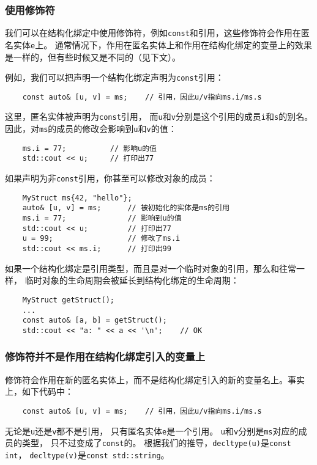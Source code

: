 \subsubsection*{使用修饰符}
我们可以在结构化绑定中使用修饰符，例如\texttt{const}和引用，这些修饰符会作用在匿名实体\texttt{e}上。
通常情况下，作用在匿名实体上和作用在结构化绑定的变量上的效果是一样的，但有些时候又是不同的（见下文）。

例如，我们可以把声明一个结构化绑定声明为\texttt{const}引用：
\begin{lstlisting}
    const auto& [u, v] = ms;    // 引用，因此u/v指向ms.i/ms.s
\end{lstlisting}
这里，匿名实体被声明为\texttt{const}引用，
而\texttt{u}和\texttt{v}分别是这个引用的成员\texttt{i}和\texttt{s}的别名。
因此，对\texttt{ms}的成员的修改会影响到\texttt{u}和\texttt{v}的值：
\begin{lstlisting}
    ms.i = 77;          // 影响u的值
    std::cout << u;     // 打印出77
\end{lstlisting}
如果声明为非\texttt{const}引用，你甚至可以修改对象的成员：
\begin{lstlisting}
    MyStruct ms{42, "hello"};
    auto& [u, v] = ms;      // 被初始化的实体是ms的引用
    ms.i = 77;              // 影响到u的值
    std::cout << u;         // 打印出77
    u = 99;                 // 修改了ms.i
    std::cout << ms.i;      // 打印出99
\end{lstlisting}
如果一个结构化绑定是引用类型，而且是对一个临时对象的引用，那么和往常一样，
临时对象的生命周期会被延长到结构化绑定的生命周期：
\begin{lstlisting}
    MyStruct getStruct();
    ...
    const auto& [a, b] = getStruct();
    std::cout << "a: " << a << '\n';    // OK
\end{lstlisting}

\subsubsection*{修饰符并不是作用在结构化绑定引入的变量上}
修饰符会作用在新的匿名实体上，而不是结构化绑定引入的新的变量名上。事实上，如下代码中：
\begin{lstlisting}
    const auto& [u, v] = ms;    // 引用，因此u/v指向ms.i/ms.s
\end{lstlisting}
无论是\texttt{u}还是\texttt{v}都不是引用， 只有匿名实体\texttt{e}是一个引用。
\texttt{u}和\texttt{v}分别是\texttt{ms}对应的成员的类型，
只不过变成了\texttt{const}的。
根据我们的推导，\texttt{decltype(u)}是\texttt{const int}，
\texttt{decltype(v)}是\texttt{const std::string}。

